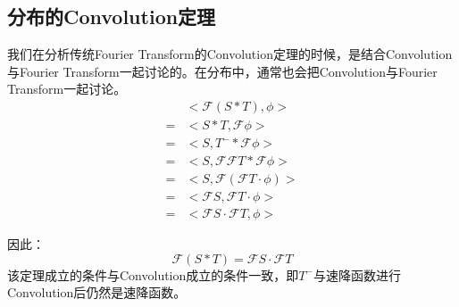 \subsection{分布的Convolution定理}
我们在分析传统Fourier Transform的Convolution定理的时候，是结合Convolution与Fourier Transform一起讨论的。在分布中，通常也会把Convolution与Fourier Transform一起讨论。
\begin{align*}
	  & <\mathcal{F}(S*T),\phi>                     \\
	= & <S*T,\mathcal{F}\phi>                       \\
	= & <S,T^-*\mathcal{F}\phi>                     \\
	= & <S,\mathcal{F}\mathcal{F}T*\mathcal{F}\phi> \\
	= & <S,\mathcal{F}(\mathcal{F}T\cdot \phi)>     \\
	= & <\mathcal{F}S,\mathcal{F}T\cdot \phi>       \\
	= & <\mathcal{F}S\cdot \mathcal{F}T,\phi>
\end{align*}

因此：
\begin{equation}
	\mathcal{F}(S*T)=\mathcal{F}S\cdot \mathcal{F}T
\end{equation}
该定理成立的条件与Convolution成立的条件一致，即$T^−$与速降函数进行Convolution后仍然是速降函数。